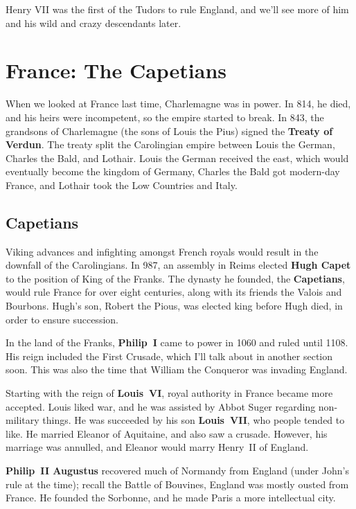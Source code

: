 Henry VII was the first of the Tudors to rule England,
and we'll see more of him and his wild and crazy descendants later.

\section{France: The Capetians}

When we looked at France last time, Charlemagne was in power.
In 814, he died, and his heirs were incompetent, so the empire started to break.
In 843, the grandsons of Charlemagne (the sons of Louis the Pius)
signed the \textbf{Treaty of Verdun}.
The treaty split the Carolingian empire between Louis the German, Charles the Bald, and Lothair.
Louis the German received the east, which would eventually become the kingdom of Germany,
Charles the Bald got modern-day France,
and Lothair took the Low Countries and Italy.

\subsection*{Capetians}

Viking advances and infighting amongst French royals
would result in the downfall of the Carolingians.
In 987, an assembly in Reims elected \textbf{Hugh Capet} to the position of King of the Franks.
The dynasty he founded, the \textbf{Capetians}, would rule France for over eight centuries,
along with its friends the Valois and Bourbons.
Hugh's son, Robert the Pious, was elected king before Hugh died, in order to ensure succession.

In the land of the Franks, \textbf{Philip~I} came to power in 1060 and ruled until 1108.
His reign included the First Crusade, which I'll talk about in another section soon.
This was also the time that William the Conqueror was invading England.

Starting with the reign of \textbf{Louis~VI}, royal authority in France became more accepted.
Louis liked war, and he was assisted by Abbot Suger regarding non-military things.
He was succeeded by his son \textbf{Louis~VII}, who people tended to like.
He married Eleanor of Aquitaine, and also saw a crusade.
However, his marriage was annulled, and Eleanor would marry Henry~II of England.

\textbf{Philip~II Augustus} recovered much of Normandy from England (under John's rule at the time);
recall the Battle of Bouvines, England was mostly ousted from France.
He founded the Sorbonne, and he made Paris a more intellectual city.

